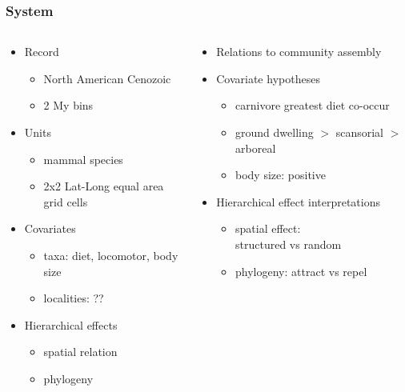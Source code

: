 \documentclass{beamer}
\begin{document}
\begin{frame}
  \frametitle{System}

  \begin{columns}
    \begin{column}{0.5\textwidth}
      \begin{itemize}
        \item Record
          \begin{itemize}
            \item North American Cenozoic
            \item 2 My bins
          \end{itemize}
        \item Units
          \begin{itemize}
            \item mammal species 
            \item 2x2 Lat-Long equal area grid cells
          \end{itemize}
        \item Covariates
          \begin{itemize}
            \item taxa: diet, locomotor, body size
            \item localities: ??
          \end{itemize}
        \item Hierarchical effects
          \begin{itemize}
            \item spatial relation
            \item phylogeny
          \end{itemize}
      \end{itemize}
    \end{column}
    \begin{column}{0.5\textwidth}
      \begin{itemize}
        \item Relations to community assembly
        \item Covariate hypotheses
          \begin{itemize}
            \item carnivore greatest diet co-occur
            \item ground dwelling \(>\) scansorial \(>\) arboreal
            \item body size: positive
          \end{itemize}
        \item Hierarchical effect interpretations
          \begin{itemize}
            \item spatial effect: \\structured vs random
            \item phylogeny: attract vs repel
          \end{itemize}
      \end{itemize}
    \end{column}
  \end{columns}
\end{frame}
\end{document}
